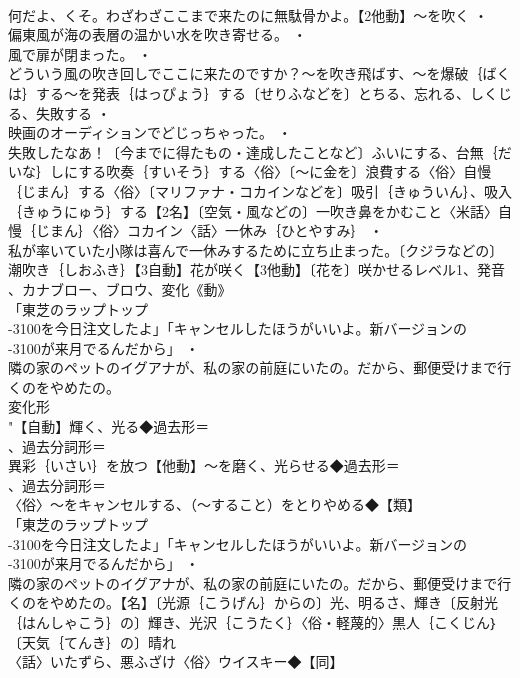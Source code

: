 \documentclass[8pt]{extreport}
\begin{document}
\begin{CJK}{UTF8}{min}
\\	何だよ、くそ。わざわざここまで来たのに無駄骨かよ。【2他動】～を吹く ・
\\	偏東風が海の表層の温かい水を吹き寄せる。 ・
\\	風で扉が閉まった。 ・
\\	どういう風の吹き回しでここに来たのですか？～を吹き飛ばす、～を爆破｛ばくは｝する～を発表｛はっぴょう｝する〔せりふなどを〕とちる、忘れる、しくじる、失敗する ・
\\	映画のオーディションでどじっちゃった。 ・
\\	失敗したなあ！〔今までに得たもの・達成したことなど〕ふいにする、台無｛だいな｝しにする吹奏｛すいそう｝する〈俗〉〔～に金を〕浪費する〈俗〉自慢｛じまん｝する〈俗〉〔マリファナ・コカインなどを〕吸引｛きゅういん｝、吸入｛きゅうにゅう｝する【2名】〔空気・風などの〕一吹き鼻をかむこと〈米話〉自慢｛じまん｝〈俗〉コカイン〈話〉一休み｛ひとやすみ｝ ・
\\	私が率いていた小隊は喜んで一休みするために立ち止まった。〔クジラなどの〕潮吹き｛しおふき｝【3自動】花が咲く【3他動】〔花を〕咲かせるレベル1、発音
\\	、カナブロー、ブロウ、変化《動》
\\	「東芝のラップトップ
\\	-3100を今日注文したよ」「キャンセルしたほうがいいよ。新バージョンの
\\	-3100が来月でるんだから」 ・
\\	隣の家のペットのイグアナが、私の家の前庭にいたの。だから、郵便受けまで行くのをやめたの。
\\	変化形 
\\	"【自動】輝く、光る◆過去形＝
\\	、過去分詞形＝
\\	異彩｛いさい｝を放つ【他動】～を磨く、光らせる◆過去形＝
\\	、過去分詞形＝
\\	〈俗〉～をキャンセルする、（～すること）をとりやめる◆【類】
\\	「東芝のラップトップ
\\	-3100を今日注文したよ」「キャンセルしたほうがいいよ。新バージョンの
\\	-3100が来月でるんだから」 ・
\\	隣の家のペットのイグアナが、私の家の前庭にいたの。だから、郵便受けまで行くのをやめたの。【名】〔光源｛こうげん｝からの〕光、明るさ、輝き〔反射光｛はんしゃこう｝の〕輝き、光沢｛こうたく｝〈俗・軽蔑的〉黒人｛こくじん｝〔天気｛てんき｝の〕晴れ
\\	〈話〉いたずら、悪ふざけ〈俗〉ウイスキー◆【同】

\end{CJK}
\end{document}
